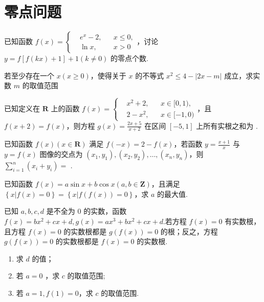 \documentclass[a4paper , final]{ctexart}
\newenvironment{problem}[1]{%
  \item #1
  \par
  \vspace{8cm}
}{}
\begin{document}
\newpage
\section*{零点问题}

\begin{problems}
    \begin{problem}
    {
    已知函数 $ f(x) = \left\{\begin{aligned} &e^x-2,&&x\leq 0,\\ &\ln{x} ,&&x>0\end{aligned}\right.$，讨论 $ y = f\left[f(kx)+1\right]+1(k\neq 0)$ 的零点个数.
    }
    \end{problem}

    \begin{problem}
    {
    若至少存在一个 $ x(x\geq 0)$，使得关于 $ x$ 的不等式 $x^2\leq 4-\left\vert 2x-m \right\vert$ 成立，求实数 $m$ 的取值范围
    }
    \end{problem}

    \begin{problem}
    {
    已知定义在 $\mathbf{R}$ 上的函数 $ f(x) = \left\{\begin{aligned}&x^2+2,&&x\in [0,1),\\&2-x^2,&& x\in[-1,0)\end{aligned}\right.$，且 $ f(x+2) = f(x)$，则方程 $ g(x) = \frac{2x+5}{x+2}$ 在区间 $ [-5,1]$ 上所有实根之和为 \underline{\hspace{1.5cm}}.
    }
    \end{problem}

    \begin{problem}
    {
    已知函数 $f(x)(x\in \mathbf{R})$ 满足 $ f(-x) = 2-f(x)$，若函数 $ y = \frac{x+1}{x}$ 与 $ y = f(x)$ 图像的交点为 $ (x_1,y_1),(x_2,y_2),\ldots , (x_n,y_n)$，则 $\sum_{i = 1}^n(x_i+y_i)=$ \underline{\hspace{1.5cm}}.
    }
    \end{problem}

    \begin{problem}
    {
    已知函数 $ f(x)= a\sin{x}+b\cos{x}(a,b\in \mathbf{Z})$，且满足 $ \left\{x\vert f(x)=0\right\} = \left\{x\vert f(f(x))=0\right\}$，求 $a$ 的最大值.
    }
    \end{problem}


    \newpage
    \begin{problem}
    {
    已知 $ a,b,c,d$ 是不全为 $ 0$ 的实数，函数 $ f(x) = bx^2+cx+d,g(x) = ax^3+bx^2+cx+d$.若方程 $ f(x) = 0$ 有实数根，且方程 $ f(x) = 0$ 的实数根都是 $ g(f(x)) = 0$ 的根；反之，方程 $ g(f(x)) = 0$ 的实数根都是 $ f(x) = 0$ 的实数根.
    \begin{enumerate}[label=(\arabic*)]
        \item 求 $ d$ 的值；
        \item 若 $ a =0$ ，求 $ c$ 的取值范围;
        \item 若 $ a = 1,f(1) = 0$，求 $ c$ 的取值范围.
    \end{enumerate}
    }
    \vspace{4cm}
    \end{problem}


\end{problems}
\end{document}
